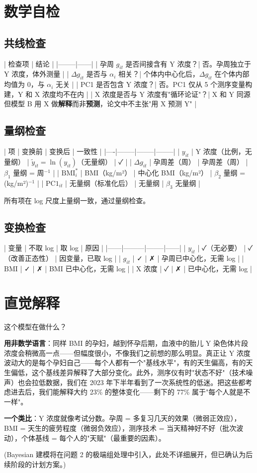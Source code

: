 \documentclass{internal-report}
\begin{document}
\section{数学自检}

\subsection{共线检查}

| 检查项 | 结论 |
|--------|------|
| 孕周 $g_{it}$ 是否间接含有 Y 浓度？| 否。孕周独立于 Y 浓度，体外测量 |
| $\Delta g_{it}$ 是否与 $\alpha_i$ 相关？| 个体内中心化后，$\Delta g_{it}$ 在个体内部均值为 0，与 $\alpha_i$ 无关 |
| PC1 是否包含 Y 浓度？| 否。PC1 仅从 5 个测序变量构建，Y 和 X 浓度均不在内 |
| X 浓度是否与 Y 浓度有"循环论证"？| X 和 Y 同源但模型 B 用 X 做\textbf{解释}而非\textbf{预测}，论文中不主张"用 X 预测 Y" |

\subsection{量纲检查}

| 项 | 变换前 | 变换后 | 一致性 |
|----|--------|--------|--------|
| $y_{it}$ | Y 浓度（比例，无量纲） | $\tilde{y}_{it} = \ln(y_{it})$（无量纲） | ✓ |
| $\Delta g_{it}$ | 孕周差（周） | 孕周差（周） | $\beta_1$ 量纲 = 周$^{-1}$ |
| $\text{BMI}_i^*$ | BMI（kg/m²） | 中心化 BMI（kg/m²） | $\beta_2$ 量纲 = (kg/m²)$^{-1}$ |
| $\text{PC1}_{it}$ | 无量纲（标准化后） | 无量纲 | $\beta_3$ 无量纲 |

所有项在 log 尺度上量纲一致，通过量纲检查。

\subsection{变换检查}

| 变量 | 不取 log | 取 log | 原因 |
|------|---------|--------|------|
| $y_{it}$ | ✓（无必要） | ✓（改善正态性） | 因变量，已取 log |
| $g_{it}$ | ✓ | ✗ | 孕周已中心化，无需 log |
| $\text{BMI}$ | ✓ | ✗ | BMI 已中心化，无需 log |
| X 浓度 | ✓ | ✗ | 已中心化，无需 log |

\section{直觉解释}

这个模型在做什么？

\textbf{用非数学语言}：同样 BMI 的孕妇，越到怀孕后期，血液中的胎儿 Y 染色体片段浓度会稍微高一点——但幅度很小，不像我们之前想的那么明显。真正让 Y 浓度波动大的是每个孕妇自己——每个人都有一个"基线水平"，有的天生偏高，有的天生偏低，这个基线差异解释了大部分变化。此外，测序仪有时"状态不好"（技术噪声）也会拉低数据，我们在 2023 年下半年看到了一次系统性的低迷。把这些都考虑进去后，我们能解释大约 23\% 的整体变化——剩下的 77\% 属于"每个人就是不一样"。

\textbf{一个类比}：Y 浓度就像考试分数。孕周 = 多复习几天的效果（微弱正效应），BMI = 天生的疲劳程度（微弱负效应），测序技术 = 当天精神好不好（批次波动），个体基线 = 每个人的"天赋"（最重要的因素）。

(Bayesian 建模将在问题 2 的极端组处理中引入，此处不详细展开，但已确认为后续阶段的计划方案。)
\end{document}
